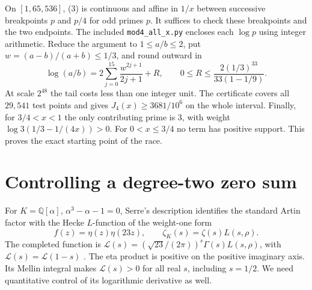 \documentclass[11pt]{article}
\newcommand{\QQ}{\mathbb Q}
\newcommand{\Li}{\mathcal L}
\begin{document}
On $[1,65{,}536]$, (3) is continuous and affine in $1/x$ between successive breakpoints $p$ and $p/4$ for odd primes $p$. It suffices to check these breakpoints and the two endpoints. The included \texttt{mod4\_all\_x.py} encloses each $\log p$ using integer arithmetic. Reduce the argument to $1\le a/b\le2$, put $w=(a-b)/(a+b)\le1/3$, and round outward in
\[
 \log(a/b)=2\sum_{j=0}^{15}\frac{w^{2j+1}}{2j+1}+R,\qquad
 0\le R\le\frac{2(1/3)^{33}}{33(1-1/9)} .
\]
At scale $2^{48}$ the tail costs less than one integer unit. The certificate covers all $29{,}541$ test points and gives $J_4(x)\ge3681/10^6$ on the whole interval. Finally, for $3/4<x<1$ the only contributing prime is 3, with weight $\log3(1/3-1/(4x))>0$. For $0<x\le3/4$ no term has positive support. This proves the exact starting point of the race.
 
\newpage
\section{Controlling a degree-two zero sum}
For $K=\QQ[\alpha]$, $\alpha^3-\alpha-1=0$, Serre's description identifies the standard Artin factor with the Hecke $L$-function of the weight-one form
\[
 f(z)=\eta(z)\eta(23z),\qquad
 \zeta_K(s)=\zeta(s)L(s,\rho).                                      \tag{8}
\]
The completed function is $\Li(s)=(\sqrt{23}/(2\pi))^s\Gamma(s)L(s,\rho)$, with $\Li(s)=\Li(1-s)$ \cite{serre,zagier}. The eta product is positive on the positive imaginary axis. Its Mellin integral makes $\Li(s)>0$ for all real $s$, including $s=1/2$. We need quantitative control of its logarithmic derivative as well.
\end{document}
